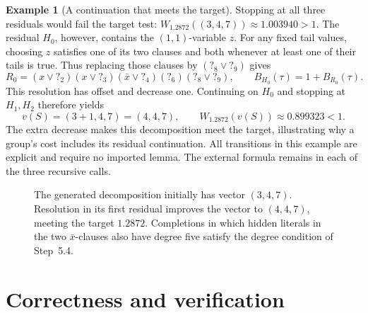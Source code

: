 \documentclass[11pt]{article}
\newcommand{\tail}[1]{\mathord{?}_{#1}}
\theoremstyle{definition}
\newtheorem{example}{Example}
\theoremstyle{remark}
\begin{document}
\begin{example}[A continuation that meets the target]
Stopping at all three residuals would fail the target test:
$W_{1.2872}((3,4,7))\approx1.003940>1$.
The residual $H_0$, however, contains the $(1,1)$-variable $z$. For any fixed
tail values, choosing $z$ satisfies one of its two clauses and both whenever
at least one of their tails is true. Thus replacing those clauses by
$(\tail{8}\vee\tail{9})$ gives
\[
 R_0=(x\vee\tail{2})(x\vee\tail{3})(\bar x\vee\tail{4})
     (\tail{6})(\tail{8}\vee\tail{9}),
 \qquad B_{H_0}(\tau)=1+B_{R_0}(\tau).
\]
This resolution has offset and decrease one. Continuing on $H_0$ and
stopping at $H_1,H_2$ therefore yields
\[
 v(S)=(3+1,4,7)=(4,4,7),\qquad
 W_{1.2872}(v(S))\approx0.899323<1.
\]
The extra decrease makes this decomposition meet the target, illustrating
why a group's cost includes its residual continuation. All transitions in
this example are explicit and require no imported lemma. The external
formula remains in each of the three recursive calls.
\end{example}

\begin{figure}[!htbp]
\centering
{}
\caption{The generated decomposition initially has vector $(3,4,7)$.
Resolution in its first residual improves the vector to $(4,4,7)$, meeting
the target $1.2872$. Completions in which hidden literals in the two
$\bar x$-clauses also have degree five satisfy the degree condition of Step~5.4.}
\label{fig:example}
\end{figure}

\section{Correctness and verification}
\label{sec:verification}
\label{sec:implementation-checker}
\end{document}
